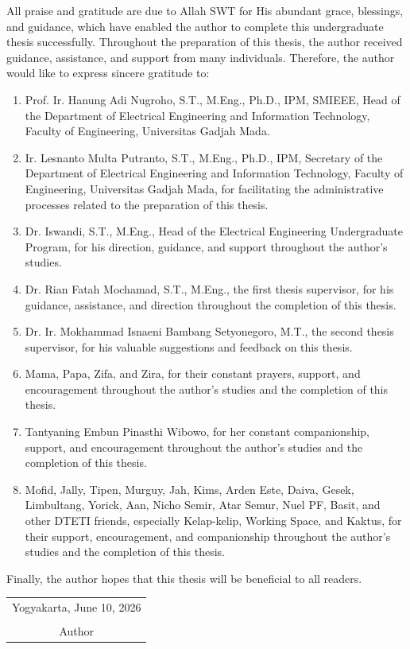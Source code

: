 All praise and gratitude are due to Allah SWT for His abundant grace, blessings, and guidance, which have enabled the author to complete this undergraduate thesis successfully. Throughout the preparation of this thesis, the author received guidance, assistance, and support from many individuals. Therefore, the author would like to express sincere gratitude to:

\begin{enumerate}
	\item Prof. Ir. Hanung Adi Nugroho, S.T., M.Eng., Ph.D., IPM, SMIEEE, Head of the Department of Electrical Engineering and Information Technology, Faculty of Engineering, Universitas Gadjah Mada.

	\item Ir. Lesnanto Multa Putranto, S.T., M.Eng., Ph.D., IPM, Secretary of the Department of Electrical Engineering and Information Technology, Faculty of Engineering, Universitas Gadjah Mada, for facilitating the administrative processes related to the preparation of this thesis.
	
	\item Dr. Iswandi, S.T., M.Eng., Head of the Electrical Engineering Undergraduate Program, for his direction, guidance, and support throughout the author's studies.

	\item Dr. Rian Fatah Mochamad, S.T., M.Eng., the first thesis supervisor, for his guidance, assistance, and direction throughout the completion of this thesis.

	\item Dr. Ir. Mokhammad Isnaeni Bambang Setyonegoro, M.T., the second thesis supervisor, for his valuable suggestions and feedback on this thesis.
	
	\item Mama, Papa, Zifa, and Zira, for their constant prayers, support, and encouragement throughout the author's studies and the completion of this thesis.
	
	\item Tantyaning Embun Pinasthi Wibowo, for her constant companionship, support, and encouragement throughout the author's studies and the completion of this thesis.
	
	\item Mofid, Jally, Tipen, Murguy, Jah, Kims, Arden Este, Daiva, Gesek, Limbultang, Yorick, Aan, Nicho Semir, Atar Semur, Nuel PF, Basit, and other DTETI friends, especially Kelap-kelip, Working Space, and Kaktus, for their support, encouragement, and companionship throughout the author's studies and the completion of this thesis.
\end{enumerate}

Finally, the author hopes that this thesis will be beneficial to all readers.

\begin{flushright}
	\begin{tabular}{c}
		Yogyakarta, June 10, 2026\\
		\vspace{1cm} \\
		Author
	\end{tabular}
\end{flushright}
